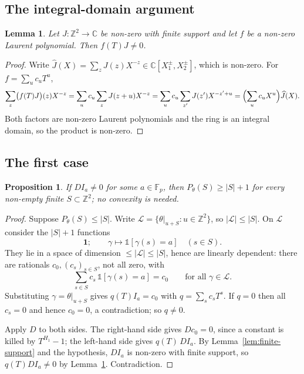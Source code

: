 \documentclass[11pt,reqno]{amsart}
\theoremstyle{plain}
\newtheorem{lem}[thm]{Lemma}
\newtheorem{prop}[thm]{Proposition}
\theoremstyle{definition}
\theoremstyle{remark}
\theoremstyle{plain}
\theoremstyle{remark}
\theoremstyle{definition}
\numberwithin{equation}{section}
\newcommand{\Z}{\mathbb{Z}}
\newcommand{\C}{\mathbb{C}}
\newcommand{\Fp}{\mathbb{F}_p}
\newcommand{\one}{\mathbb{1}}
\newcommand{\cL}{\mathcal{L}}
\begin{document}
\subsection{The integral-domain argument}

\begin{lem}\label{lem:domain}
Let $J\colon\Z^2\to\C$ be non-zero with finite support and let $f$ be a non-zero
Laurent polynomial.  Then $f(T)J\ne0$.
\end{lem}

\begin{proof}
Write $\widehat J(X)=\sum_zJ(z)X^{-z}\in\C[X_1^{\pm},X_2^{\pm}]$, which is
non-zero.  For $f=\sum_uc_uT^u$,
\[\sum_z\bigl(f(T)J\bigr)(z)X^{-z}
  =\sum_uc_u\sum_zJ(z+u)X^{-z}
  =\sum_uc_u\sum_{z'}J(z')X^{-z'+u}
  =\Bigl(\sum_uc_uX^{u}\Bigr)\widehat J(X).\]
Both factors are non-zero Laurent polynomials and the ring is an integral
domain, so the product is non-zero.
\end{proof}

\subsection{The first case}

\begin{prop}\label{prop:case-A}
If $DI_a\ne0$ for some $a\in\Fp$, then $P_\theta(S)\ge|S|+1$ for
\emph{every} non-empty finite $S\subset\Z^2$; no convexity is needed.
\end{prop}

\begin{proof}
Suppose $P_\theta(S)\le|S|$.  Write $\cL=\{\theta|_{u+S}:u\in\Z^2\}$, so
$|\cL|\le|S|$.  On $\cL$ consider the $|S|+1$ functions
\[\mathbf 1;\qquad \gamma\mapsto\one[\gamma(s)=a]\quad(s\in S).\]
They lie in a space of dimension $\le|\cL|\le|S|$, hence are linearly
dependent: there are rationals $c_0,(c_s)_{s\in S}$, not all zero, with
\[\sum_{s\in S}c_s\,\one[\gamma(s)=a]=c_0\qquad\text{for all }\gamma\in\cL .\]
Substituting $\gamma=\theta|_{u+S}$ gives $q(T)I_a=c_0$ with
$q=\sum_sc_sT^s$.  If $q=0$ then all $c_s=0$ and hence $c_0=0$, a
contradiction; so $q\ne0$.

Apply $D$ to both sides.  The right-hand side gives $Dc_0=0$, since a constant
is killed by $T^{H_1}-1$; the left-hand side gives $q(T)\,DI_a$.  By
Lemma~\ref{lem:finite-support} and the hypothesis, $DI_a$ is non-zero with
finite support, so $q(T)DI_a\ne0$ by Lemma~\ref{lem:domain}.  Contradiction.
\end{proof}
\end{document}
